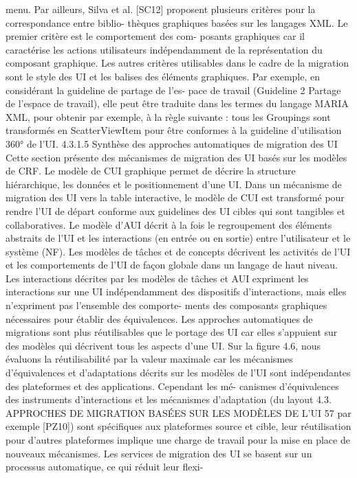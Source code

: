 \documentclass{article}
\begin{document}
menu.
Par ailleurs, Silva et al. [SC12] proposent plusieurs critères pour la correspondance entre biblio-
thèques graphiques basées sur les langages XML. Le premier critère est le comportement des com-
posants graphiques car il caractérise les actions utilisateurs indépendamment de la représentation du
composant graphique. Les autres critères utilisables dans le cadre de la migration sont le style des UI
et les balises des éléments graphiques. Par exemple, en considérant la guideline de partage de l’es-
pace de travail (Guideline 2 Partage de l’espace de travail), elle peut être traduite dans les termes
du langage MARIA XML, pour obtenir par exemple, à la règle suivante : tous les Groupings sont
transformés en ScatterViewItem pour être conformes à la guideline d’utilisation 360° de l’UI.
4.3.1.5
Synthèse des approches automatiques de migration des UI
Cette section présente des mécanismes de migration des UI basés sur les modèles de CRF. Le
modèle de CUI graphique permet de décrire la structure hiérarchique, les données et le positionnement
d’une UI. Dans un mécanisme de migration des UI vers la table interactive, le modèle de CUI est
transformé pour rendre l’UI de départ conforme aux guidelines des UI cibles qui sont tangibles et
collaboratives.
Le modèle d’AUI décrit à la fois le regroupement des éléments abstraits de l’UI et les interactions
(en entrée ou en sortie) entre l’utilisateur et le système (NF). Les modèles de tâches et de concepts
décrivent les activités de l’UI et les comportements de l’UI de façon globale dans un langage de haut
niveau.
Les interactions décrites par les modèles de tâches et AUI expriment les interactions sur une UI
indépendamment des dispositifs d’interactions, mais elles n’expriment pas l’ensemble des comporte-
ments des composants graphiques nécessaires pour établir des équivalences.
Les approches automatiques de migrations sont plus réutilisables que le portage des UI car elles
s’appuient sur des modèles qui décrivent tous les aspects d’une UI. Sur la ﬁgure 4.6, nous évaluons
la réutilisabilité par la valeur maximale car les mécanismes d’équivalences et d’adaptations décrits
sur les modèles de l’UI sont indépendantes des plateformes et des applications. Cependant les mé-
canismes d’équivalences des instruments d’interactions et les mécanismes d’adaptation (du layout
4.3. APPROCHES DE MIGRATION BASÉES SUR LES MODÈLES DE L’UI
57
par exemple [PZ10]) sont spéciﬁques aux plateformes source et cible, leur réutilisation pour d’autres
plateformes implique une charge de travail pour la mise en place de nouveaux mécanismes.
Les services de migration des UI se basent sur un processus automatique, ce qui réduit leur ﬂexi-
\end{document}
